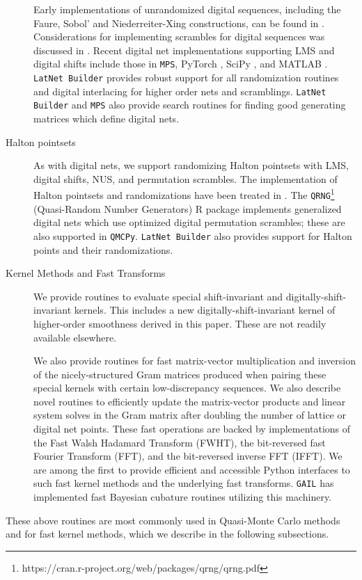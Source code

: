 \documentclass[acmsmall]{acmart}
\newcommand{\FJHNote}[1]{\textcolor{blue}{#1}}
\begin{document}
\begin{description}
    Early implementations of unrandomized digital sequences, including the Faure, Sobol' and Niederreiter-Xing constructions, can be found in \citep{fox1986algorithm,bratley1992implementation,bratley2003implementing,pirsic2002software}. Considerations for implementing scrambles for digital sequences was discussed in \citep{hong2003algorithm}. Recent digital net implementations supporting LMS and digital shifts  include those in \texttt{MPS}, PyTorch \citep{paszke2019pytorch}, SciPy \citep{virtanen2020scipy}, and MATLAB \citep{MATLAB}. \texttt{LatNet Builder} provides robust support for all randomization routines and digital interlacing for higher order nets and scramblings. \texttt{LatNet Builder} and \texttt{MPS} also provide search routines for finding good generating matrices which define digital nets. 
    \item[Halton pointsets] As with digital nets, we support randomizing Halton pointsets with LMS, digital shifts, NUS, and permutation scrambles. The implementation of Halton pointsets and randomizations have been treated in \citep{owen_halton,wang2000randomized}. The \texttt{QRNG}\footnote{https://cran.r-project.org/web/packages/qrng/qrng.pdf} (Quasi-Random Number Generators) R package \citep{qrng.software} implements generalized digital nets which use optimized digital permutation scrambles; these are also supported in \texttt{QMCPy}. \texttt{LatNet Builder} also provides support for Halton points and their randomizations. 
    \item[Kernel Methods and Fast Transforms] We provide routines to evaluate special shift-invariant and digitally-shift-invariant kernels. This includes a new digitally-shift-invariant kernel of higher-order smoothness derived in this paper. These are not readily available elsewhere. 
    
    We also provide routines for fast matrix-vector multiplication and inversion of the nicely-structured Gram matrices produced when pairing these special kernels with certain low-discrepancy sequences. We also describe novel routines to efficiently update the matrix-vector products and linear system solves in the Gram matrix after doubling the number of lattice or digital net points. These fast operations are backed by implementations of the Fast Walsh Hadamard Transform (FWHT), the bit-reversed fast Fourier Transform (FFT), and the bit-reversed inverse FFT (IFFT). We are among the first to provide efficient and accessible Python interfaces to such fast kernel methods and the underlying fast transforms. \texttt{GAIL} has implemented fast Bayesian cubature routines utilizing this machinery. 
\end{description}
These above routines are most commonly used in Quasi-Monte Carlo methods and for fast kernel methods, which we describe in the following subsections. 
\end{document}
